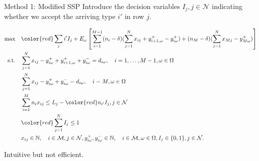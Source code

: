   \begin{frame}{Method 1: Modified SSP}
    \small
    Introduce the decision variables $I_j, j \in \mathcal{N}$ indicating whether we accept the arriving type $i{'}$ in row $j$.
    
      \begin{tiny}
        \begin{equation}\label{adjusted_SSP}
        \begin{aligned}
        \max \quad & {\color{red}\sum_{j} i{'} I_j} + E_{\omega}\left[\sum_{i=1}^{M-1} (n_i-\delta) (\sum_{j= 1}^{N} x_{ij} + y_{i+1,\omega}^{+} - y_{i \omega}^{+}) + (n_{M}-\delta) (\sum_{j= 1}^{N} x_{Mj} - y_{M \omega}^{+})\right] \\
        \text {s.t.} \quad & \sum_{j= 1}^{N} x_{ij}-y_{i \omega}^{+}+
        y_{i+1, \omega}^{+} + y_{i \omega}^{-}=d_{i \omega}, \quad i = 1,\ldots,M-1, \omega \in \Omega \\
        & \sum_{j= 1}^{N} x_{ij} -y_{i \omega}^{+}+y_{i \omega}^{-}=d_{i \omega}, \quad i = M, \omega \in \Omega \\
        & \sum_{i=1}^{M} n_{i} x_{ij} \leq L_j - {\color{red}n_{i{'}} I_j}, j \in \mathcal{N} \\
        & {\color{red}\sum_{j=1}^{N} I_j \leq 1} \\
        & x_{ij} \in \mathbb{N}, \quad i \in \mathcal{M}, j \in \mathcal{N}, y_{i \omega}^{+}, y_{i \omega}^{-} \in \mathbb{N}, \quad i \in \mathcal{M}, \omega \in \Omega,  I_j \in \{0,1\}, j \in \mathcal{N}.
        \end{aligned}
      \end{equation}
    \end{tiny}
    Intuitive but not efficient.
  \end{frame}

      
      
  
  

